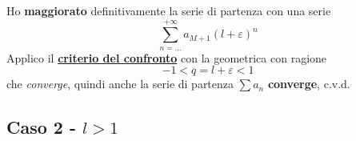 \documentclass[../dimostrazioni]{subfiles}
\begin{document}
                Ho \textbf{maggiorato} definitivamente la serie di partenza con una serie
                \[ \sum_{n=\dots}^{+\infty} a_{M+1}(l + \varepsilon)^{n}\] 
                Applico il \textbf{\hyperref[serieconfronto]{criterio del confronto}} con la geometrica con ragione
                \[-1 < q = l + \varepsilon < 1 \]
                che \emph{converge}, quindi anche la serie di partenza \(\sum a_n \) \textbf{converge}, c.v.d.

            \subsection*{Caso 2 - \(l > 1\)}
                
                
\end{document}

